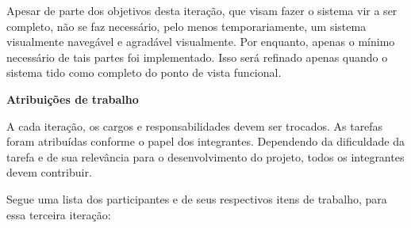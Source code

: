 \documentclass[12pt,letterpaper]{article}
\begin{document}
Apesar de parte dos objetivos desta iteração, que visam fazer o sistema vir a ser 
completo, não se faz necessário, pelo menos temporariamente, um sistema visualmente 
navegável e agradável visualmente. Por enquanto, apenas o mínimo necessário de tais 
partes foi implementado. Isso será refinado apenas quando o sistema tido como completo 
do ponto de vista funcional.





\vspace{1cm}
{\large {\bf Atribuições de trabalho}}
\vspace{0.5cm}

A cada iteração, os cargos e responsabilidades devem ser trocados. As tarefas foram atribuídas conforme o papel dos integrantes. Dependendo da dificuldade da tarefa e de sua relevância para o desenvolvimento do projeto, todos os integrantes devem contribuir.

Segue uma lista dos participantes e de seus respectivos itens de trabalho, para essa terceira iteração: 
\end{document}
